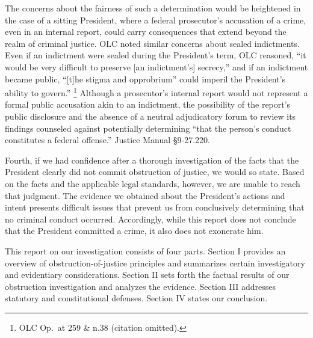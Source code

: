The concerns about the fairness of such a determination would be heightened in the case of a sitting President, where a federal prosecutor’s accusation of a crime, even in an internal report, could carry consequences that extend beyond the realm of criminal justice.
OLC noted similar concerns about sealed indictments.
Even if an indictment were sealed during the President’s term, OLC reasoned, “it would be very difficult to preserve [an indictment’s] secrecy,” and if an indictment became public, “[t]he stigma and opprobrium” could imperil the President’s ability to govern.”%
\footnote{OLC Op.\ at 259 \& n.38 (citation omitted).}
Although a prosecutor’s internal report would not represent a formal public accusation akin to an indictment, the possibility of the report’s public disclosure and the absence of a neutral adjudicatory forum to review its findings counseled against potentially determining “that the person’s conduct constitutes a federal offense.”
Justice Manual \S 9-27.220.

Fourth, if we had confidence after a thorough investigation of the facts that the President clearly did not commit obstruction of justice, we would so state.
Based on the facts and the applicable legal standards, however, we are unable to reach that judgment.
The evidence we obtained about the President’s actions and intent presents difficult issues that prevent us from
conclusively determining that no criminal conduct occurred.
Accordingly, while this report does not conclude that the President committed a crime, it also does not exonerate him.

\hr

This report on our investigation consists of four parts.
Section I provides an overview of obstruction-of-justice principles and summarizes certain investigatory and evidentiary considerations.
Section II sets forth the factual results of our obstruction investigation and analyzes the evidence.
Section III addresses statutory and constitutional defenses.
Section IV states our conclusion.
